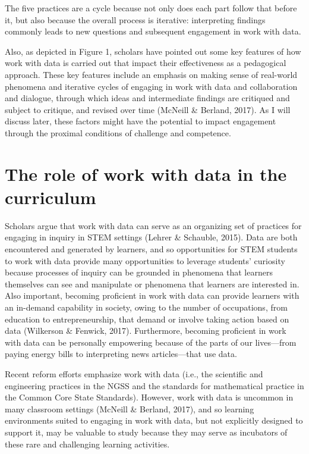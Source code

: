 \documentclass[]{book}
\theoremstyle{definition}
\theoremstyle{definition}
\theoremstyle{definition}
\theoremstyle{remark}
\begin{document}
The five practices are a cycle because not only does each part follow
that before it, but also because the overall process is iterative:
interpreting findings commonly leads to new questions and subsequent
engagement in work with data.

Also, as depicted in Figure 1, scholars have pointed out some key
features of how work with data is carried out that impact their
effectiveness as a pedagogical approach. These key features include an
emphasis on making sense of real-world phenomena and iterative cycles of
engaging in work with data and collaboration and dialogue, through which
ideas and intermediate findings are critiqued and subject to critique,
and revised over time (McNeill \& Berland, 2017). As I will discuss
later, these factors might have the potential to impact engagement
through the proximal conditions of challenge and competence.

\section{The role of work with data in the
curriculum}\label{the-role-of-work-with-data-in-the-curriculum}

Scholars argue that work with data can serve as an organizing set of
practices for engaging in inquiry in STEM settings (Lehrer \& Schauble,
2015). Data are both encountered and generated by learners, and so
opportunities for STEM students to work with data provide many
opportunities to leverage students' curiosity because processes of
inquiry can be grounded in phenomena that learners themselves can see
and manipulate or phenomena that learners are interested in. Also
important, becoming proficient in work with data can provide learners
with an in-demand capability in society, owing to the number of
occupations, from education to entrepreneurship, that demand or involve
taking action based on data (Wilkerson \& Fenwick, 2017). Furthermore,
becoming proficient in work with data can be personally empowering
because of the parts of our lives---from paying energy bills to
interpreting news articles---that use data.

Recent reform efforts emphasize work with data (i.e., the scientific and
engineering practices in the NGSS and the standards for mathematical
practice in the Common Core State Standards). However, work with data is
uncommon in many classroom settings (McNeill \& Berland, 2017), and so
learning environments suited to engaging in work with data, but not
explicitly designed to support it, may be valuable to study because they
may serve as incubators of these rare and challenging learning
activities.
\end{document}
